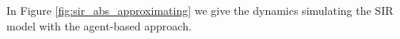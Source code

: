 In Figure \ref{fig:sir_abs_approximating} we give the dynamics simulating the SIR model with the agent-based approach.

%
	
\begin{figure}
\begin{center}


\end{center}
\end{figure}
